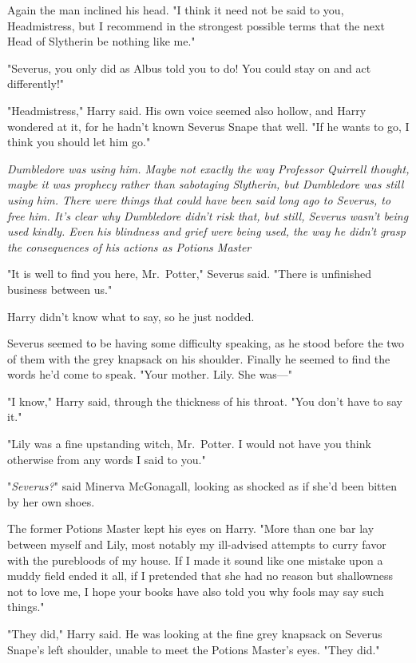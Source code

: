Again the man inclined his head. "I think it need not be said to you,
Headmistress, but I recommend in the strongest possible terms that the next
Head of Slytherin be nothing like me."

"Severus, you only did as Albus told you to do! You could stay on and act
differently!"

"Headmistress," Harry said. His own voice seemed also hollow, and Harry
wondered at it, for he hadn't known Severus Snape that well. "If he wants to
go, I think you should let him go."

\emph{Dumbledore was using him. Maybe not exactly the way Professor Quirrell
thought, maybe it was prophecy rather than sabotaging Slytherin, but Dumbledore
was still using him. There were things that could have been said long ago to
Severus, to free him. It's clear why Dumbledore didn't risk that, but still,
Severus wasn't being used kindly. Even his blindness and grief were being used,
the way he didn't grasp the consequences of his actions as Potions
Master{\el}}

"It is well to find you here, Mr.~Potter," Severus said. "There is unfinished
business between us."

Harry didn't know what to say, so he just nodded.

Severus seemed to be having some difficulty speaking, as he stood before the
two of them with the grey knapsack on his shoulder. Finally he seemed to find
the words he'd come to speak. "Your mother. Lily. She was—"

"I know," Harry said, through the thickness of his throat. "You don't have to
say it."

"Lily was a fine upstanding witch, Mr.~Potter. I would not have you think
otherwise from any words I said to you."

"\emph{Severus?}" said Minerva McGonagall, looking as shocked as if she'd been
bitten by her own shoes.

The former Potions Master kept his eyes on Harry. "More than one bar lay
between myself and Lily, most notably my ill-advised attempts to curry favor
with the purebloods of my house. If I made it sound like one mistake upon a
muddy field ended it all, if I pretended that she had no reason but shallowness
not to love me, I hope your books have also told you why fools may say such
things."

"They did," Harry said. He was looking at the fine grey knapsack on Severus
Snape's left shoulder, unable to meet the Potions Master's eyes. "They did."

